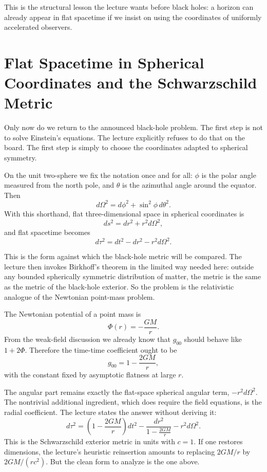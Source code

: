 This is the structural lesson the lecture wants before black holes: a horizon can already appear in flat spacetime if we insist on using the coordinates of uniformly accelerated observers.

\section{Flat Spacetime in Spherical Coordinates and the Schwarzschild Metric}

Only now do we return to the announced black-hole problem. The first step is not to solve Einstein's equations. The lecture explicitly refuses to do that on the board. The first step is simply to choose the coordinates adapted to spherical symmetry.

On the unit two-sphere we fix the notation once and for all: \(\phi\) is the polar angle measured from the north pole, and \(\theta\) is the azimuthal angle around the equator. Then
\begin{equation}
d\Omega^2 = d\phi^2 + \sin^2\phi\,d\theta^2.
\end{equation}
With this shorthand, flat three-dimensional space in spherical coordinates is
\begin{equation}
ds^2 = dr^2 + r^2 d\Omega^2,
\end{equation}
and flat spacetime becomes
\begin{equation}
d\tau^2 = dt^2 - dr^2 - r^2 d\Omega^2.
\end{equation}

This is the form against which the black-hole metric will be compared. The lecture then invokes Birkhoff's theorem in the limited way needed here: outside any bounded spherically symmetric distribution of matter, the metric is the same as the metric of the black-hole exterior. So the problem is the relativistic analogue of the Newtonian point-mass problem.

The Newtonian potential of a point mass is
\begin{equation}
\Phi(r)=-\frac{GM}{r}.
\end{equation}
From the weak-field discussion we already know that \(g_{00}\) should behave like \(1+2\Phi\). Therefore the time-time coefficient ought to be
\begin{equation}
g_{00}=1-\frac{2GM}{r},
\end{equation}
with the constant fixed by asymptotic flatness at large \(r\).

The angular part remains exactly the flat-space spherical angular term, \(-r^2 d\Omega^2\). The nontrivial additional ingredient, which does require the field equations, is the radial coefficient. The lecture states the answer without deriving it:
\begin{equation}
d\tau^2
=
\left(1-\frac{2GM}{r}\right)dt^2
-
\frac{dr^2}{1-\frac{2GM}{r}}
-
r^2 d\Omega^2.
\end{equation}
This is the Schwarzschild exterior metric in units with \(c=1\). If one restores dimensions, the lecture's heuristic reinsertion amounts to replacing \(2GM/r\) by \(2GM/(rc^2)\). But the clean form to analyze is the one above.

